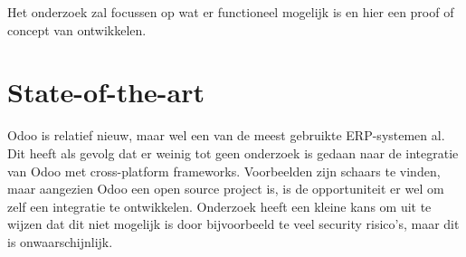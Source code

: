 \bigskip 

Het onderzoek zal focussen op wat er functioneel mogelijk is en hier een proof of concept van ontwikkelen.


\section{State-of-the-art}%
\label{sec:state-of-the-art}

Odoo is relatief nieuw, maar wel een van de meest gebruikte ERP-systemen al.
Dit heeft als gevolg dat er weinig tot geen onderzoek is gedaan naar de integratie van Odoo met cross-platform frameworks.
Voorbeelden zijn schaars te vinden, maar aangezien Odoo een open source project is, is de opportuniteit er wel om zelf een integratie te ontwikkelen.
Onderzoek heeft een kleine kans om uit te wijzen dat dit niet mogelijk is door bijvoorbeeld te veel security risico's, maar dit is onwaarschijnlijk.


